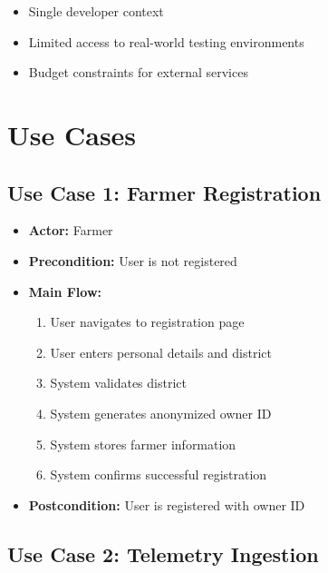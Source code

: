 \begin{itemize}
    \item Single developer context
    \item Limited access to real-world testing environments
    \item Budget constraints for external services
\end{itemize}

\section{Use Cases}

\subsection{Use Case 1: Farmer Registration}

\begin{itemize}
    \item \textbf{Actor:} Farmer
    \item \textbf{Precondition:} User is not registered
    \item \textbf{Main Flow:}
    \begin{enumerate}
        \item User navigates to registration page
        \item User enters personal details and district
        \item System validates district
        \item System generates anonymized owner ID
        \item System stores farmer information
        \item System confirms successful registration
    \end{enumerate}
    \item \textbf{Postcondition:} User is registered with owner ID
\end{itemize}

\subsection{Use Case 2: Telemetry Ingestion}


